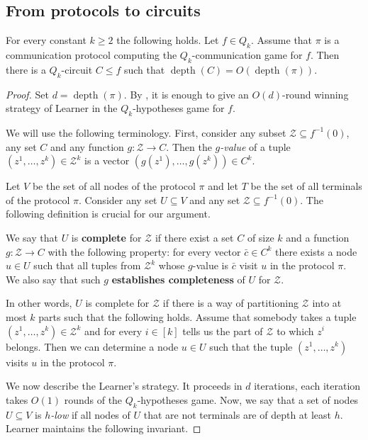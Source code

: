 \documentclass{toc}
\DeclareMathOperator{\depth}{depth}  %
\begin{document}
\subsection{From protocols to circuits} \label{subsec:prot_to_circ}
\begin{proposition}
\label{Q_k_to_circuits}
For every constant $k\ge 2$ the following holds. Let $f\in Q_k$. Assume that $\pi$ is a communication protocol computing the $Q_k$-communication game for $f$. Then there is a $Q_k$-circuit $C \le f$ such that $\depth(C) = O(\depth(\pi))$.
\end{proposition}
\begin{proof}



Set $d = \depth(\pi)$. By ,
it is enough to give an $O(d)$-round winning strategy of Learner in the $Q_k$-hypotheses game for $f$.

We will use the following terminology. First, consider any subset $\mathcal{Z}\subseteq f^{-1}(0)$, any set $C$ and any function $g\colon \mathcal{Z}\to C$. Then the \emph{$g$-value} of a tuple $(z^1, \ldots, z^k) \in \mathcal{Z}^k$  is a vector $(g(z^1), \ldots, g(z^k)) \in C^k$.

Let $V$ be the set of all nodes of the protocol $\pi$ and let $T$ be the set of all terminals of the protocol $\pi$. Consider any set $U\subseteq V$ and any set $\mathcal{Z}\subseteq f^{-1}(0)$. The following definition is crucial for our argument.
\begin{definition}
 We say that $U$ is \textbf{complete} for $\mathcal{Z}$ if there exist a set $C$ of size $k$ and a function $g\colon\mathcal{Z}\to C$ with the following property: for every vector $\bar{c}\in C^k$ there exists a node $u\in U$ such that all tuples from $\mathcal{Z}^k$ whose $g$-value is $\bar{c}$ visit $u$ in the protocol $\pi$. We also say that such $g$ \textbf{establishes completeness} of $U$ for $\mathcal{Z}$.
\end{definition}

In other words, $U$ is complete for $\mathcal{Z}$ if there is a way of partitioning $\mathcal{Z}$ into at most $k$ parts such that the following holds. Assume that somebody takes a tuple $(z^1, \ldots, z^k)\in\mathcal{Z}^k$ and for every $i\in [k]$ tells us the part of $\mathcal{Z}$ to which $z^i$ belongs. Then we can determine a node $u\in U$ such that the tuple $(z^1, \ldots, z^k)$ visits $u$ in the protocol $\pi$.

We now describe the Learner's strategy. It proceeds in $d$ iterations, each iteration takes $O(1)$ rounds of the $Q_k$-hypotheses game. Now, we say that a set of nodes $U\subseteq V$ is \emph{$h$-low} if all nodes of $U$ that are not terminals are of depth at least $h$. Learner maintains the following invariant.


\end{proof}
\end{document}
